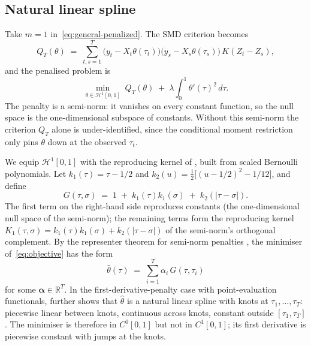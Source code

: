 \documentclass[12pt]{article}
\newcommand{\R}{\mathbb{R}}
\newcommand{\calH}{\mathcal{H}}
\begin{document}
\subsection{Natural linear spline}\label{sec:estimator}

Take $m = 1$ in~\eqref{eq:general-penalized}. The SMD criterion becomes
\begin{equation}\label{eq:QT}
  Q_T(\theta) \;=\; \sum_{t,s=1}^T \bigl(y_t - X_t \theta(\tau_t)\bigr)
                    \bigl(y_s - X_s \theta(\tau_s)\bigr) \, K(Z_t - Z_s),
\end{equation}
and the penalised problem is
\begin{equation}\label{eq:objective}
  \min_{\theta \in \calH^1[0,1]} \; Q_T(\theta) \;+\; \lambda \int_0^1 \theta'(\tau)^2 \, d\tau.
\end{equation}
The penalty is a semi-norm: it vanishes on every constant function, so the null space is the one-dimensional subspace of constants. Without this semi-norm the criterion $Q_T$ alone is under-identified, since the conditional moment restriction only pins $\theta$ down at the observed $\tau_t$.

We equip $\calH^1[0,1]$ with the reproducing kernel of \citet[eq.\ 1.2.2]{Wahba1990}, built from scaled Bernoulli polynomials. Let $k_1(\tau) = \tau - 1/2$ and $k_2(u) = \tfrac{1}{2}\bigl[(u - 1/2)^2 - 1/12\bigr]$, and define
\begin{equation}\label{eq:wahba-kernel}
  G(\tau, \sigma) \;=\; 1 \;+\; k_1(\tau) k_1(\sigma) \;+\; k_2(|\tau - \sigma|).
\end{equation}
The first term on the right-hand side reproduces constants (the one-dimensional null space of the semi-norm); the remaining terms form the reproducing kernel $K_1(\tau,\sigma) = k_1(\tau)k_1(\sigma) + k_2(|\tau - \sigma|)$ of the semi-norm's orthogonal complement. By the representer theorem for semi-norm penalties \citep[Theorem 3.1]{KimeldorfWahba1971}, the minimiser of~\eqref{eq:objective} has the form
\begin{equation}\label{eq:representer-m1}
  \hat\theta(\tau) \;=\; \sum_{i=1}^T \alpha_i\, G(\tau, \tau_i)
\end{equation}
for some $\boldsymbol\alpha \in \R^T$. In the first-derivative-penalty case with point-evaluation functionals, \citet[Example 3.1]{KimeldorfWahba1971} further shows that $\hat\theta$ is a natural linear spline with knots at $\tau_1, \ldots, \tau_T$: piecewise linear between knots, continuous across knots, constant outside $[\tau_1, \tau_T]$. The minimiser is therefore in $C^0[0,1]$ but not in $C^1[0,1]$; its first derivative is piecewise constant with jumps at the knots.
\end{document}
